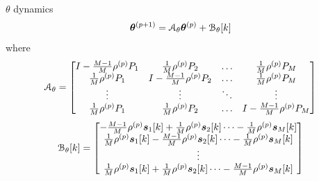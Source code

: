 \documentclass[handout,aspectratio=169]{beamer}
\begin{document}
\begin{frame}{$\theta$ dynamics}{\hyperlink{analysis_continued}{}}
  \hypertarget{theta_dynamics}{}
  \begin{equation*}
    \vec{\theta}\pplusone=\mathcal{A}_{\theta}\vec{\theta}\p+\mathcal{\vec{B}}_{\theta}[k]
  \end{equation*}
  where
  \begin{equation*}
    \mathcal{A}_{\theta}=\left[
      \begin{matrix}
        I-\frac{M-1}{M}\rho\p \Plin[1] & \frac{1}{M}\rho\p \Plin[2]&\dots&\frac{1}{M}\rho\p \Plin[M]\\
        \frac{1}{M}\rho\p \Plin[1]&I-\frac{M-1}{M}\rho\p \Plin[2]&\dots&\frac{1}{M}\rho\p \Plin[M]\\
        \vdots&\vdots&\ddots&\vdots\\
        \frac{1}{M}\rho\p \Plin[1]&\frac{1}{M}\rho\p \Plin[2]&\dots&I-\frac{M-1}{M}\rho\p \Plin[M]\\
      \end{matrix}
    \right]
  \end{equation*}
  \begin{equation*}
    \mathcal{\vec{B}}_{\theta}[k]=\left[
      \begin{matrix}
        -\frac{M-1}{M}\rho\p \vec{s}_{1}[k]+\frac{1}{M}\rho\p \vec{s}_{2}[k]\dots-\frac{1}{M}\rho\p \vec{s}_{M}[k]\\
        \frac{1}{M}\rho\p \vec{s}_{1}[k]-\frac{M-1}{M}\rho\p \vec{s}_{2}[k] \dots-\frac{1}{M}\rho\p \vec{s}_{M}[k]\\
        \vdots\\
        \frac{1}{M}\rho\p \vec{s}_{1}[k]+\frac{1}{M}\rho\p \vec{s}_{2}[k]\dots-\frac{M-1}{M}\rho\p \vec{s}_{M}[k]\\
      \end{matrix}
    \right]
  \end{equation*}
\end{frame}
\end{document}
